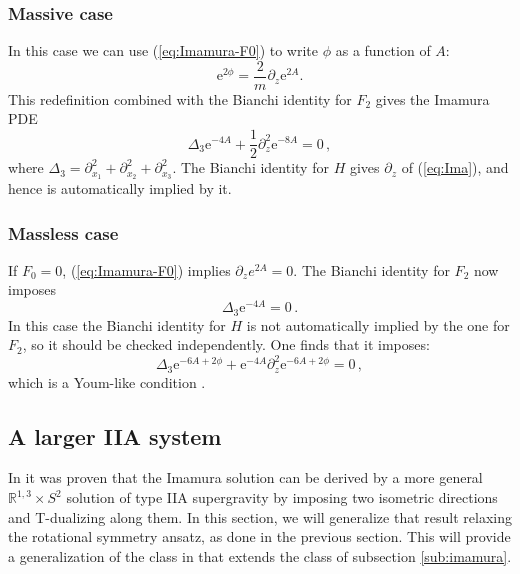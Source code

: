 \documentclass[12pt]{article}
\newcommand{\R}{\mathbb{R}}
\newcommand{\e}{\mathrm{e}}
\begin{document}
\subsubsection{Massive case}

In this case we can use (\ref{eq:Imamura-F0}) to write $\phi$ as a function of $A$:
\begin{equation}
\label{eq:phi_susy}
\e^{2\phi} = \frac{2}{m}\partial_{z}\e^{2 A}.
\end{equation}
This redefinition combined with the Bianchi identity for $F_2$ gives the Imamura PDE
\begin{equation}
\label{eq:Ima}
\Delta_3 \e^{-4A}+\frac{1}{2}\partial_{z}^2 \e^{-8A}=0 \, ,
\end{equation} 
where $\Delta_3= \partial_{x_1}^2+\partial_{x_2}^2+\partial_{x_3}^2$. The Bianchi identity for $H$ gives $\partial_z$ of (\ref{eq:Ima}), and hence is automatically implied by it.


\subsubsection{Massless case}

If $F_0=0$, (\ref{eq:Imamura-F0}) implies $\partial_{z}e^{2 A} = 0$. The Bianchi identity for $F_2$ now imposes
\begin{equation}
\Delta_3 \e^{-4A} = 0 \, .
\end{equation}
In this case the Bianchi identity for $H$ is not automatically implied by the one for $F_2$, so it should be checked independently. One finds that it imposes: 
\begin{equation}
\Delta_3 \e^{-6A + 2 \phi}+\e^{-4A}\partial_{z}^2 \e^{-6A + 2 \phi} = 0 \, ,
\end{equation}
which is a Youm-like condition \cite{youm}.



\subsection{A larger IIA system} \label{sub:largerIIA}

In \cite[App.~C]{l-macpherson} it was proven that the Imamura solution can be derived by a more general $\R^{1,3} \times S^2$ solution of type IIA supergravity by imposing two isometric directions and T-dualizing along them. In this section, we will generalize that result relaxing the rotational symmetry ansatz, as done in the previous section. This will provide a generalization of the class in \cite[App.~C]{l-macpherson} that extends the class of subsection \ref{sub:imamura}.
\end{document}
